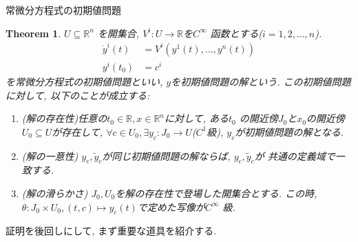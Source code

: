 \documentclass{ltjsarticle}
\newtheorem{theorem}{Theorem}
\newcommand{\jtoday}{\number \year 年 \number \month 月 \number \day 日}
\begin{document}
\centerline{\Large 常微分方程式の初期値問題}
\rightline{\jtoday}

\begin{theorem}
   $U \subseteq \mathbb{R}^n$ を開集合, $V^i : U \to \mathbb{R}$を$C^{\infty}$ 函数とする($i = 1,2,\ldots ,n$). 
   \begin{align}
     \dot{y}^i (t) &= V^i(y^1(t), \ldots , y^n(t)) \\
     y^i(t_0) &= c^i 
   \end{align}
を常微分方程式の初期値問題といい, $y$を初期値問題の解という. 
この初期値問題に対して, 以下のことが成立する: 

\begin{enumerate}
  \item (解の存在性)任意の$t_0 \in \mathbb{R}, x \in \mathbb{R}^n $に対して, 
    ある$t_0$ の開近傍$J_0$と$x_0$の開近傍$U_0 \subseteq U$が存在して, 
    $\forall c \in U_0, \exists y_c: J_0 \to U $($C^1$級), $y_c$が初期値問題の解となる. 
  \item (解の一意性)  $y_c, \tilde{y}_c$が同じ初期値問題の解ならば,  $y_c, \tilde{y}_c$が
    共通の定義域で一致する. 
  \item (解の滑らかさ)  $J_0, U_0$を解の存在性で登場した開集合とする. この時, 
    $\theta :J_0 \times U_0, (t,c) \mapsto y_c(t)$で定めた写像が$C^{\infty}$ 級. 
\end{enumerate}
\end{theorem}

証明を後回しにして, まず重要な道具を紹介する. 
\end{document}
